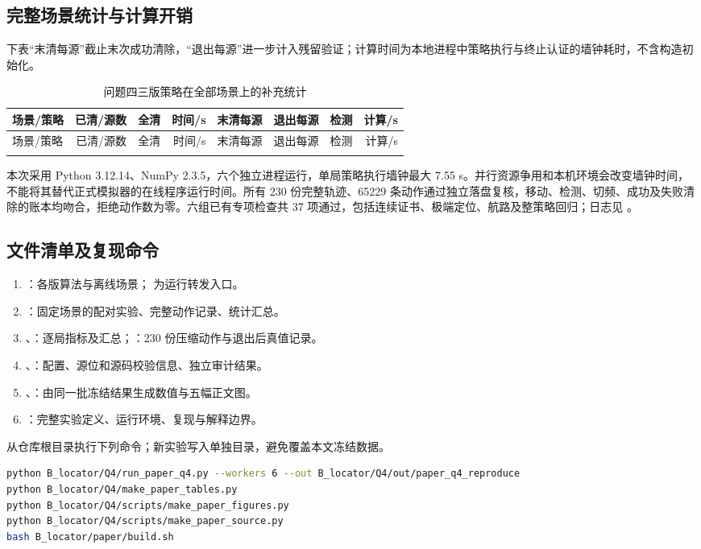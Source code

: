 \subsection{完整场景统计与计算开销}
下表“末清每源”截止末次成功清除，“退出每源”进一步计入残留验证；计算时间为本地进程中策略执行与终止认证的墙钟耗时，不含构造初始化。
\begingroup\small
\begin{longtable}{@{}lrrrrrrr@{}}
\caption{问题四三版策略在全部场景上的补充统计}\\
\toprule 场景/策略 & 已清/源数 & 全清 & 时间/s & 末清每源 & 退出每源 & 检测 & 计算/s\\\midrule\endfirsthead
\toprule 场景/策略 & 已清/源数 & 全清 & 时间/s & 末清每源 & 退出每源 & 检测 & 计算/s\\\midrule\endhead
\\
\bottomrule\end{longtable}\endgroup

本次采用 Python 3.12.14、NumPy 2.3.5，六个独立进程运行，单局策略执行墙钟最大 7.55 s。并行资源争用和本机环境会改变墙钟时间，不能将其替代正式模拟器的在线程序运行时间。所有 230 份完整轨迹、65229 条动作通过独立落盘复核，移动、检测、切频、成功及失败清除的账本均吻合，拒绝动作数为零。六组已有专项检查共 37 项通过，包括连续证书、极端定位、航路及整策略回归；日志见 。

\subsection{文件清单及复现命令}
\begin{enumerate}
\item {}：各版算法与离线场景； 为运行转发入口。
\item {}：固定场景的配对实验、完整动作记录、统计汇总。
\item {}、：逐局指标及汇总；：230 份压缩动作与退出后真值记录。
\item {}、：配置、源位和源码校验信息、独立审计结果。
\item {}、：由同一批冻结结果生成数值与五幅正文图。
\item {}：完整实验定义、运行环境、复现与解释边界。
\end{enumerate}
从仓库根目录执行下列命令；新实验写入单独目录，避免覆盖本文冻结数据。
\begin{lstlisting}[language=bash,caption={问题四实验与论文图表的复现命令}]
python B_locator/Q4/run_paper_q4.py --workers 6 --out B_locator/Q4/out/paper_q4_reproduce
python B_locator/Q4/make_paper_tables.py
python B_locator/Q4/scripts/make_paper_figures.py
python B_locator/Q4/scripts/make_paper_source.py
bash B_locator/paper/build.sh
\end{lstlisting}


